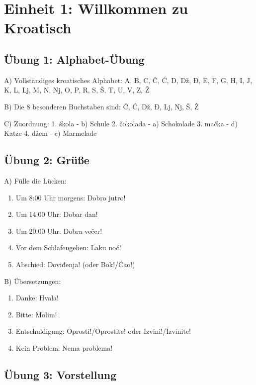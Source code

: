 
\section{Einheit 1: Willkommen zu Kroatisch}

\subsection*{Übung 1: Alphabet-Übung}

A) Vollständiges kroatisches Alphabet:
A, B, C, Č, Ć, D, Dž, Đ, E, F, G, H, I, J, K, L, Lj, M, N, Nj, O, P, R, S, Š, T, U, V, Z, Ž

B) Die 8 besonderen Buchstaben sind: Č, Ć, Dž, Đ, Lj, Nj, Š, Ž

C) Zuordnung:
1. škola - b) \glqq Schule\grqq{}
2. čokolada - a) \glqq Schokolade\grqq{}
3. mačka - d) \glqq Katze\grqq{}
4. džem - c) \glqq Marmelade\grqq{}

\subsection*{Übung 2: Grüße}

A) Fülle die Lücken:
\begin{enumerate}
    \item Um 8:00 Uhr morgens: Dobro jutro!
    \item Um 14:00 Uhr: Dobar dan!
    \item Um 20:00 Uhr: Dobra večer!
    \item Vor dem Schlafengehen: Laku noć!
    \item Abschied: Doviđenja! (oder Bok!/Ćao!)
\end{enumerate}

B) Übersetzungen:
\begin{enumerate}
    \item Danke: Hvala!
    \item Bitte: Molim!
    \item Entschuldigung: Oprosti!/Oprostite! oder Izvini!/Izvinite!
    \item Kein Problem: Nema problema!
\end{enumerate}

\subsection*{Übung 3: Vorstellung}

